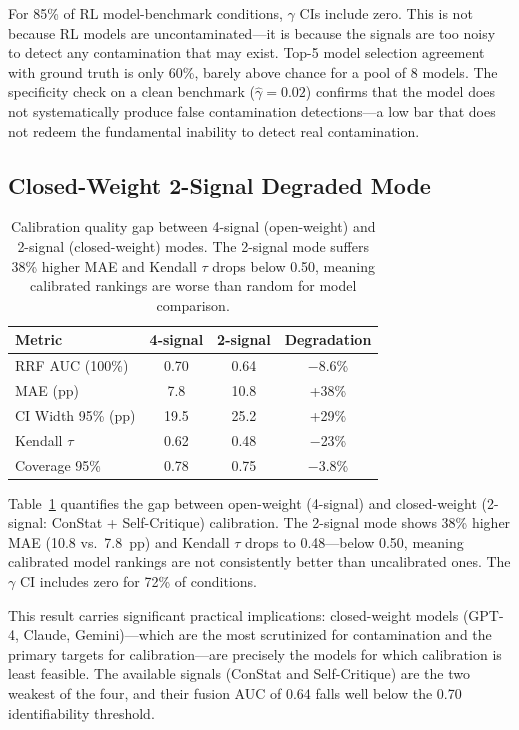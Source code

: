 \documentclass[letterpaper, 10pt, twocolumn]{article}
\begin{document}
For 85\% of RL model-benchmark conditions, $\gamma$ CIs include zero.
This is not because RL models are uncontaminated---it is because the signals are too noisy to detect any contamination that may exist.
Top-5 model selection agreement with ground truth is only 60\%, barely above chance for a pool of 8 models.
The specificity check on a clean benchmark ($\hat{\gamma} = 0.02$) confirms that the model does not systematically produce false contamination detections---a low bar that does not redeem the fundamental inability to detect real contamination.

\subsection{Closed-Weight 2-Signal Degraded Mode}
\label{sec:closed_weight}

\begin{table}[t]
\centering
\caption{Calibration quality gap between 4-signal (open-weight) and 2-signal (closed-weight) modes. The 2-signal mode suffers 38\% higher MAE and Kendall $\tau$ drops below 0.50, meaning calibrated rankings are worse than random for model comparison.}
\label{tab:closed_weight}
\small
\begin{tabular}{lccc}
\toprule
Metric & 4-signal & 2-signal & Degradation \\
\midrule
RRF AUC (100\%) & 0.70 & 0.64 & $-$8.6\% \\
MAE (pp) & 7.8 & 10.8 & +38\% \\
CI Width 95\% (pp) & 19.5 & 25.2 & +29\% \\
Kendall $\tau$ & 0.62 & 0.48 & $-$23\% \\
Coverage 95\% & 0.78 & 0.75 & $-$3.8\% \\
\bottomrule
\end{tabular}
\end{table}

Table~\ref{tab:closed_weight} quantifies the gap between open-weight (4-signal) and closed-weight (2-signal: ConStat + Self-Critique) calibration.
The 2-signal mode shows 38\% higher MAE (10.8 vs.\ 7.8~pp) and Kendall $\tau$ drops to 0.48---below 0.50, meaning calibrated model rankings are not consistently better than uncalibrated ones.
The $\gamma$ CI includes zero for 72\% of conditions.

This result carries significant practical implications: closed-weight models (GPT-4, Claude, Gemini)---which are the most scrutinized for contamination and the primary targets for calibration---are precisely the models for which calibration is least feasible.
The available signals (ConStat and Self-Critique) are the two weakest of the four, and their fusion AUC of 0.64 falls well below the 0.70 identifiability threshold.
\end{document}

